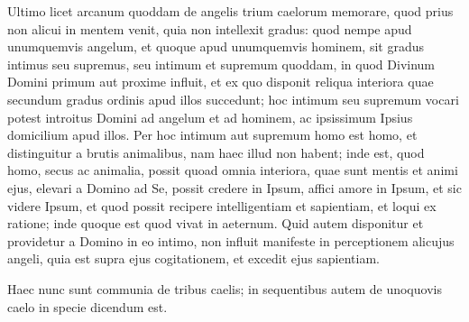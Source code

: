 \begin{topic}{39}
    Ultimo licet arcanum quoddam de angelis trium caelorum memorare, quod prius non alicui in mentem venit, quia non
    intellexit gradus: quod nempe apud unumquemvis angelum, et quoque apud unumquemvis hominem, sit gradus intimus seu
    supremus, seu intimum et supremum quoddam, in quod Divinum Domini primum aut proxime influit, et ex quo disponit
    reliqua interiora quae secundum gradus ordinis apud illos succedunt; hoc intimum seu supremum vocari potest
    introitus Domini ad angelum et ad hominem, ac ipsissimum Ipsius domicilium apud illos.
    Per hoc intimum aut supremum homo est homo, et distinguitur a brutis animalibus, nam haec illud non habent; inde
    est, quod homo, secus ac animalia, possit quoad omnia interiora, quae sunt mentis et animi ejus, elevari a Domino ad
    Se, possit credere in Ipsum, affici amore in Ipsum, et sic videre Ipsum, et quod possit recipere intelligentiam et
    sapientiam, et loqui ex ratione; inde quoque est quod vivat in aeternum.
    Quid autem disponitur et providetur a Domino in eo intimo, non influit manifeste in perceptionem alicujus angeli,
    quia est supra ejus cogitationem, et excedit ejus sapientiam.
\end{topic}

\begin{topic}{40}
    Haec nunc sunt communia de tribus caelis; in sequentibus autem de unoquovis caelo in specie dicendum est.
\end{topic}
